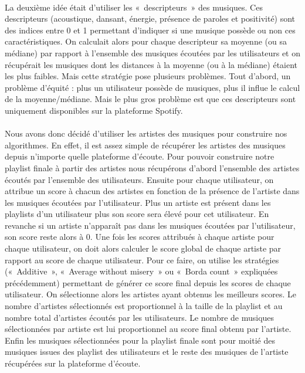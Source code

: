 \documentclass[12pt, openany]{report}
\begin{document}
\paragraph{}La deuxième idée était d’utiliser les « descripteurs » des musiques. Ces descripteurs (acoustique, dansant, énergie, présence de paroles et positivité)  sont des indices entre 0 et 1 permettant d’indiquer si une musique possède ou non ces caractéristiques. On calculait alors pour chaque descripteur sa moyenne (ou sa médiane) par rapport à l’ensemble des musiques écoutées par les utilisateurs et on récupérait les musiques dont les distances à la moyenne (ou à la médiane) étaient les plus faibles. Mais cette stratégie pose plusieurs problèmes. Tout d’abord, un problème d’équité : plus un utilisateur possède de musiques, plus il influe le calcul de la moyenne/médiane. Mais le plus gros problème est que ces descripteurs sont uniquement disponibles sur la plateforme Spotify.

\paragraph{}
Nous avons donc décidé d’utiliser les artistes des musiques pour construire nos algorithmes. En effet, il est assez simple de récupérer les artistes des musiques depuis n’importe quelle plateforme d’écoute. Pour pouvoir construire notre playlist finale à partir des artistes nous récupérons d’abord l’ensemble des artistes écoutés par l’ensemble des utilisateurs. Ensuite pour chaque utilisateur, on attribue un score à chacun des artistes en fonction de la présence de l’artiste dans les musiques écoutées par l’utilisateur. Plus un artiste est présent dans les playlists d’un utilisateur plus son score sera élevé pour cet utilisateur. En revanche si un artiste n’apparaît pas dans les musiques écoutées par l’utilisateur, son score reste alors à 0. Une fois les scores attribués à chaque artiste pour chaque utilisateur, on doit alors calculer le score global de chaque artiste par rapport au score de chaque utilisateur. Pour ce faire, on utilise les stratégies (« Additive », « Average without misery » ou « Borda count » expliquées précédemment) permettant de générer ce score final depuis les scores de chaque utilisateur. On sélectionne alors les artistes ayant obtenus les meilleurs scores. Le nombre d’artistes sélectionnés est proportionnel à la taille de la playlist et au nombre total d’artistes écoutés par les utilisateurs. Le nombre de musiques sélectionnées par artiste est lui proportionnel au score final obtenu par l’artiste. Enfin les musiques sélectionnées pour la playlist finale sont pour moitié des musiques issues des playlist des utilisateurs et le reste des musiques de l’artiste récupérées sur la plateforme d’écoute. 
\end{document}
